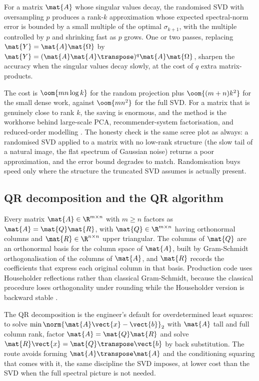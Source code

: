\begin{principle}
For a matrix $\mat{A}$ whose singular values decay, the randomised SVD
with oversampling $p$ produces a rank-$k$ approximation whose expected
spectral-norm error is bounded by a small multiple of the optimal
$\sigma_{k+1}$, with the multiple controlled by $p$ and shrinking
fast as $p$ grows. One or two  passes,
replacing $\mat{Y} = \mat{A}\mat{\Omega}$ by $\mat{Y} =
(\mat{A}\mat{A}\transpose)^{q}\mat{A}\mat{\Omega}$, sharpen the
accuracy when the singular values decay slowly, at the cost of $q$
extra matrix-products.
\end{principle}

The cost is $\oom{mn\log k}$ for the random projection plus
$\oom{(m + n)k^{2}}$ for the small dense work, against $\oom{mn^{2}}$
for the full SVD. For a matrix that is genuinely close to rank $k$,
the saving is enormous, and the method is the workhorse behind
large-scale PCA, recommender-system factorisation, and
reduced-order modelling \cite[ch.~4]{text:v2ch10-golub-vanloan2013}.
The honesty check is the same scree plot as always: a randomised SVD
applied to a matrix with no low-rank structure (the slow tail of a
natural image, the flat spectrum of Gaussian noise) returns a poor
approximation, and the error bound degrades to match. Randomisation
buys speed only where the structure the truncated SVD assumes is
actually present.

\subsection{QR decomposition and the QR algorithm}

Every matrix $\mat{A} \in \R^{m \times n}$ with $m \geq n$ factors
as $\mat{A} = \mat{Q} \mat{R}$, with $\mat{Q} \in \R^{m \times n}$
having orthonormal columns and $\mat{R} \in \R^{n \times n}$ upper
triangular. The columns of $\mat{Q}$ are an orthonormal basis for
the column space of $\mat{A}$, built by Gram-Schmidt
orthogonalisation of the columns of $\mat{A}$, and $\mat{R}$ records
the coefficients that express each original column in that basis.
Production code uses Householder reflections rather than classical
Gram-Schmidt, because the classical procedure loses orthogonality
under rounding while the Householder version is backward stable
\cite[ch.~10]{text:trefethen-bau1997}.

The QR decomposition is the engineer's default for overdetermined
least squares: to solve $\min \norm{\mat{A}\vect{x} - \vect{b}}_{2}$
with $\mat{A}$ tall and full column rank, factor $\mat{A} = \mat{Q}
\mat{R}$ and solve $\mat{R} \vect{x} = \mat{Q}\transpose \vect{b}$
by back substitution. The route avoids forming $\mat{A}\transpose
\mat{A}$ and the conditioning squaring that comes with it, the same
discipline the SVD imposes, at lower cost than the SVD when the full
spectral picture is not needed.

